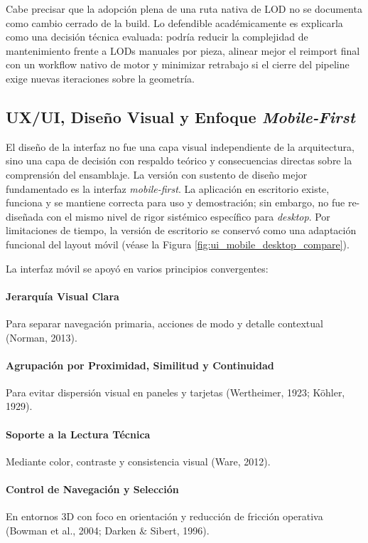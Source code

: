 Cabe precisar que la adopción plena de una ruta nativa de LOD no se documenta como cambio cerrado de la build. Lo defendible académicamente es explicarla como una decisión técnica evaluada: podría reducir la complejidad de mantenimiento frente a LODs manuales por pieza, alinear mejor el reimport final con un workflow nativo de motor y minimizar retrabajo si el cierre del pipeline exige nuevas iteraciones sobre la geometría.

\subsection{UX/UI, Diseño Visual y Enfoque \textit{Mobile-First}}

El diseño de la interfaz no fue una capa visual independiente de la arquitectura, sino una capa de decisión con respaldo teórico y consecuencias directas sobre la comprensión del ensamblaje. La versión con sustento de diseño mejor fundamentado es la interfaz \textit{mobile-first}. La aplicación en escritorio existe, funciona y se mantiene correcta para uso y demostración; sin embargo, no fue re-diseñada con el mismo nivel de rigor sistémico específico para \textit{desktop}. Por limitaciones de tiempo, la versión de escritorio se conservó como una adaptación funcional del layout móvil (véase la Figura \ref{fig:ui_mobile_desktop_compare}).

La interfaz móvil se apoyó en varios principios convergentes:

\paragraph{Jerarquía Visual Clara} Para separar navegación primaria, acciones de modo y detalle contextual (Norman, 2013).

\paragraph{Agrupación por Proximidad, Similitud y Continuidad} Para evitar dispersión visual en paneles y tarjetas (Wertheimer, 1923; Köhler, 1929).

\paragraph{Soporte a la Lectura Técnica} Mediante color, contraste y consistencia visual (Ware, 2012).

\paragraph{Control de Navegación y Selección} En entornos 3D con foco en orientación y reducción de fricción operativa (Bowman et al., 2004; Darken \& Sibert, 1996).

